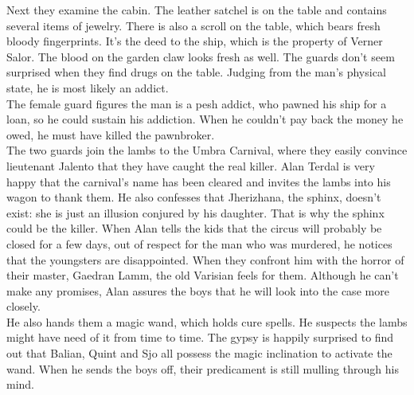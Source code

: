Next they examine the cabin. The leather satchel is on the table and contains several items of jewelry. There is also a scroll on the table, which bears fresh bloody fingerprints. It's the deed to the ship, which is the property of Verner Salor. The blood on the garden claw looks fresh as well. The guards don't seem surprised when they find drugs on the table. Judging from the man's physical state, he is most likely an addict.\\

The female guard figures the man is a pesh addict, who pawned his ship for a loan, so he could sustain his addiction. When he couldn't pay back the money he owed, he must have killed the pawnbroker.\\

The two guards join the lambs to the Umbra Carnival, where they easily convince lieutenant Jalento that they have caught the real killer. Alan Terdal is very happy that the carnival's name has been cleared and invites the lambs into his wagon to thank them. He also confesses that Jherizhana, the sphinx, doesn't exist: she is just an illusion conjured by his daughter. That is why the sphinx could be the killer. When Alan tells the kids that the circus will probably be closed for a few days, out of respect for the man who was murdered, he notices that the youngsters are disappointed. When they confront him with the horror of their master, Gaedran Lamm, the old Varisian feels for them. Although he can't make any promises, Alan assures the boys that he will look into the case more closely.\\

He also hands them a magic wand, which holds cure spells. He suspects the lambs might have need of it from time to time. The gypsy is happily surprised to find out that Balian, Quint and Sjo all possess the magic inclination to activate the wand. When he sends the boys off, their predicament is still mulling through his mind.\\

